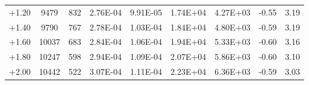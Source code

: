 \documentclass[traditabstract]{aa}
\begin{document}
\begin{table}[htbp]
\begin{tabular}{l c c c c c c c c}
   +1.20 &    9479 &    832 &   2.76E-04 &   9.91E-05 &   1.74E+04 &   4.27E+03  &    -0.55 &     3.19 \\
   +1.40 &    9790 &    767 &   2.78E-04 &   1.03E-04 &   1.84E+04 &   4.80E+03  &    -0.59 &     3.19 \\
   +1.60 &   10037 &    683 &   2.84E-04 &   1.06E-04 &   1.94E+04 &   5.33E+03  &    -0.60 &     3.16 \\
   +1.80 &   10247 &    598 &   2.94E-04 &   1.09E-04 &   2.07E+04 &   5.86E+03  &    -0.60 &     3.10 \\
   +2.00 &   10442 &    522 &   3.07E-04 &   1.11E-04 &   2.23E+04 &   6.36E+03  &    -0.59 &     3.03 \\
\hline
\end{tabular}
\end{table}

\clearpage
\end{document}
